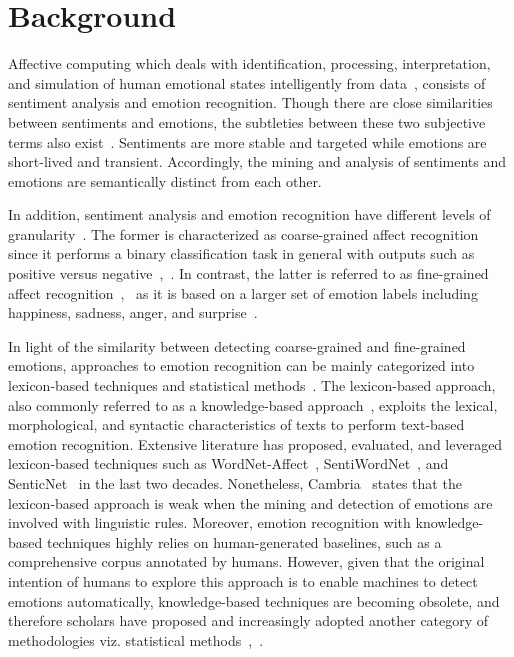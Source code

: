 \documentclass[11pt]{article}
\begin{document}
\section{Background}
\label{sec:background}

Affective computing which deals with identification, processing, interpretation, and simulation of human emotional states intelligently from data~\cite{affect_rw1}, consists of sentiment analysis and emotion recognition. Though there are close similarities between sentiments and emotions, the subtleties between these two subjective terms also exist~\cite{affect_rw3}. Sentiments are more stable and targeted while emotions are short-lived and transient. Accordingly, the mining and analysis of sentiments and emotions are semantically distinct from each other. 

In addition, sentiment analysis and emotion recognition have different levels of granularity~\cite{affect_rw1}. The former is characterized as coarse-grained affect recognition since it performs a binary classification task in general with outputs such as positive versus negative~\cite{affect_rw1},~\cite{affect_rw2}. In contrast, the latter is referred to as fine-grained affect recognition~\cite{affect_rw1},~\cite{affect_rw2} as it is based on a larger set of emotion labels including happiness, sadness, anger, and surprise~\cite{affect_rw6}. 

In light of the similarity between detecting coarse-grained and fine-grained emotions, approaches to emotion recognition can be mainly categorized into lexicon-based techniques and statistical methods~\cite{affect_rw2}. The lexicon-based approach, also commonly referred to as a knowledge-based approach~\cite{affect_rw2}, exploits the lexical, morphological, and syntactic characteristics of texts to perform text-based emotion recognition. Extensive literature has proposed, evaluated, and leveraged lexicon-based techniques such as WordNet-Affect~\cite{affect_rw8}, SentiWordNet~\cite{affect_rw9}, and SenticNet~\cite{affect_rw10} in the last two decades. Nonetheless, Cambria~\cite{affect_rw2} states that the lexicon-based approach is weak when the mining and detection of emotions are involved with linguistic rules. Moreover, emotion recognition with knowledge-based techniques highly relies on human-generated baselines, such as a comprehensive corpus annotated by humans. However, given that the original intention of humans to explore this approach is to enable machines to detect emotions automatically, knowledge-based techniques are becoming obsolete, and therefore scholars have proposed and increasingly adopted another category of methodologies viz. statistical methods~\cite{affect_rw1},~\cite{affect_rw2}. 
\end{document}
